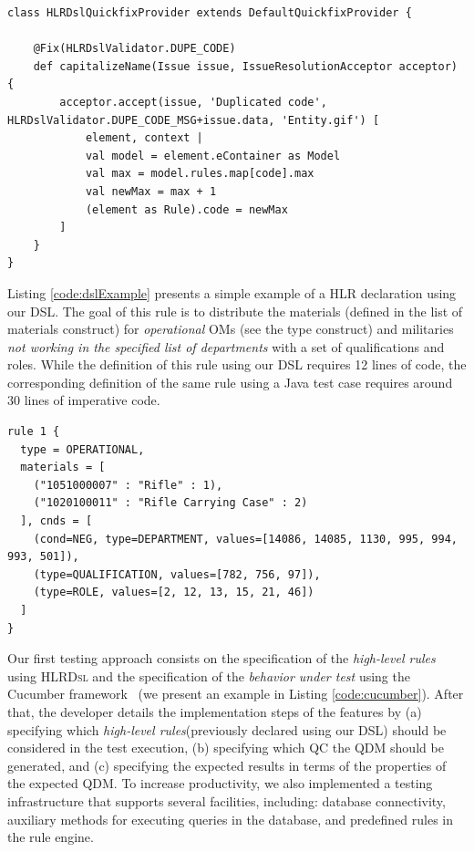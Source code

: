 \documentclass[AMA,STIX1COL]{WileyNJD-v2}
\newcommand{\callers}{\emph{high-level rules}\xspace}
\newcommand{\shc}{HLR\xspace}
\newcommand{\hlrdsl}{\textsc{HLRDsl}\xspace}
\begin{document}
\begin{small}
\begin{lstlisting}[frame=single, language=Xtend, caption={\it Quickfix Customization}, label={code:xtend_quickfix}]
class HLRDslQuickfixProvider extends DefaultQuickfixProvider {

	@Fix(HLRDslValidator.DUPE_CODE)
	def capitalizeName(Issue issue, IssueResolutionAcceptor acceptor) {
		acceptor.accept(issue, 'Duplicated code', HLRDslValidator.DUPE_CODE_MSG+issue.data, 'Entity.gif') [
			element, context |
			val model = element.eContainer as Model
			val max = model.rules.map[code].max
			val newMax = max + 1			
			(element as Rule).code = newMax
		]
	}
}
\end{lstlisting}
\end{small}

Listing \ref{code:dslExample} presents a simple example of a \shc declaration using our DSL. The goal of this rule is to distribute the materials (defined in the list of materials construct) for \emph{operational} OMs (see the type construct) and militaries \emph{not working in the specified list of departments} with a set of qualifications and roles. While the definition of this rule using our DSL requires 12 lines of code, the corresponding definition of the same rule using a Java test case requires around 30 lines of imperative code.

\begin{small}
	\begin{lstlisting}[frame=single, language=DSL, caption={\it Example of a \shc declaration using our DSL}, label={code:dslExample}]
rule 1 { 
  type = OPERATIONAL, 
  materials = [ 
    ("1051000007" : "Rifle" : 1), 
    ("1020100011" : "Rifle Carrying Case" : 2)
  ], cnds = [ 
    (cond=NEG, type=DEPARTMENT, values=[14086, 14085, 1130, 995, 994, 993, 501]),
    (type=QUALIFICATION, values=[782, 756, 97]), 
    (type=ROLE, values=[2, 12, 13, 15, 21, 46])
  ]
}
	\end{lstlisting}
\end{small}

Our first testing approach consists on the specification of the \callers using \hlrdsl and the specification of the
\emph{behavior under test} using the Cucumber framework~\cite{wynne2017cucumber} (we present an example in Listing \ref{code:cucumber}).
After that, the developer details the implementation steps of the features by (a) specifying which
\callers (previously declared using our DSL) should be considered in the test execution, (b) specifying
which QC the QDM should be generated, and (c) specifying the expected results in terms of the properties
of the expected QDM. To increase productivity, we also implemented a testing  infrastructure that supports several facilities,
including: database connectivity, auxiliary methods for executing queries in the database, and predefined
rules in the rule engine.
\end{document}

